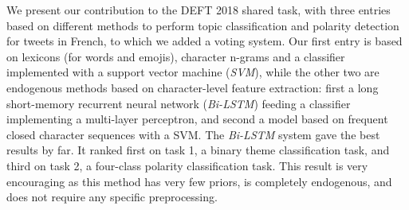 
We present our contribution to the DEFT 2018 shared task, with three entries based on different methods to perform topic classification and polarity detection for tweets in French, to which we added a voting system.
Our first entry is based on lexicons (for words and emojis), character n-grams and a classifier implemented with a support vector machine (\textit{SVM}), while the other two are endogenous methods based on character-level feature extraction: first a long short-memory recurrent neural network (\textit{Bi-LSTM}) feeding a classifier implementing a multi-layer perceptron, and second a model based on frequent closed character sequences with a {SVM}.
The \textit{Bi-LSTM} system gave the best results by far.
It ranked first on task 1, a binary theme classification task, and third on task 2, a four-class polarity classification task.
This result is very encouraging as this method has very few priors, is completely endogenous, and does not require any specific preprocessing.



